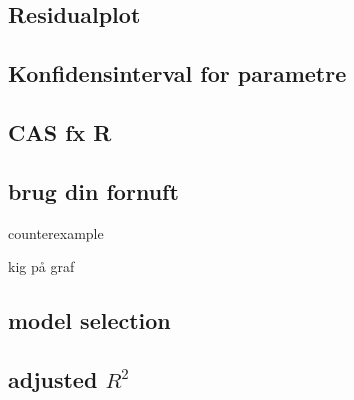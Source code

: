 \documentclass[11pt, a4paper]{article}
\begin{document}
\subsection{Residualplot}


\subsection{Konfidensinterval for parametre}


\subsection{CAS fx R}

\subsection{brug din fornuft}
counterexample

kig på graf

\subsection{model selection}

\subsection{adjusted \(R^2\)}
\end{document}
